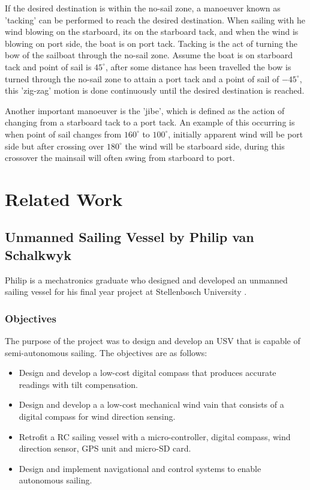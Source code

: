 If the desired destination is within the no-sail zone, a manoeuver known as 'tacking' can be performed to reach the desired destination. When sailing with 
he wind blowing on the starboard, its on the starboard tack, and when the wind is blowing on port side, the boat is on port tack. Tacking is the act of 
turning the bow of the sailboat through the no-sail zone. Assume the boat is on starboard tack and point of sail is $45^{\circ}$, after some distance has been travelled 
the bow is turned through the no-sail zone to attain a port tack and a point of sail of $-45^{\circ}$, this 'zig-zag' motion is done continuously until the 
desired destination is reached.

Another important manoeuver is the 'jibe', which is defined as the action of changing from a starboard tack to a port tack. An example of this occurring is when 
point of sail changes from $160^{\circ}$ to $100^{\circ}$, initially apparent wind will be port side but after crossing over $180^{\circ}$ the wind will be starboard side, 
during this crossover the mainsail will often swing from starboard to port.
\section{Related Work}

\subsection{Unmanned Sailing Vessel by Philip van Schalkwyk}
Philip is a mechatronics graduate who designed and developed an unmanned sailing vessel for his final year project at Stellenbosch University \cite{Phillip}.

\subsubsection{Objectives}
The purpose of the project was to design and develop an USV that is capable of semi-autonomous sailing. The objectives are as follows:

\begin{itemize}
    \item Design and develop a low-cost digital compass that produces accurate readings with tilt compensation.
    \item Design and develop a a low-cost mechanical wind vain that consists of a digital compass for wind direction sensing.
    \item Retrofit a RC sailing vessel with a micro-controller, digital compass, wind direction sensor, GPS unit and micro-SD card.
    \item Design and implement navigational and control systems to enable autonomous sailing.
\end{itemize}

